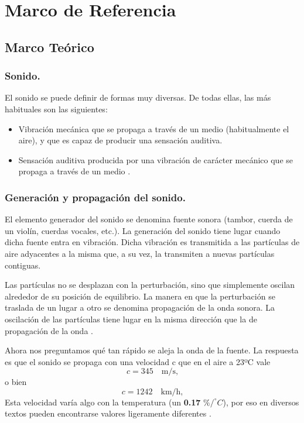 \section{Marco de Referencia}
\subsection{Marco Teórico}

\subsubsection{Sonido.} El sonido se puede definir de formas muy diversas. De todas ellas, las más habituales 
son las siguientes:

\begin{itemize}
    \item 
    Vibración mecánica que se propaga a través de un medio (habitualmente el aire), y que es 
    capaz de producir una sensación auditiva. 
    \item
    Sensación auditiva producida por una vibración de carácter mecánico que se propaga a través de un medio \cite{Isbert1998}.   
\end{itemize}

\subsubsection{Generación y propagación del sonido.} El elemento generador del sonido se denomina 
fuente sonora (tambor, cuerda de un violín, cuerdas vocales, etc.). La generación del sonido 
tiene lugar cuando dicha fuente entra en vibración. Dicha vibración es transmitida a las 
partículas de aire adyacentes a la misma que, a su vez, la transmiten a nuevas partículas 
contiguas.

Las partículas no se desplazan con la perturbación, sino que simplemente oscilan alrededor 
de su posición de equilibrio. La manera en que la perturbación se traslada de un lugar a otro 
se denomina propagación de la onda sonora. La oscilación de las partículas tiene lugar en la 
misma dirección que la de propagación de la onda \cite{Isbert1998}.

Ahora nos preguntamos qué tan rápido se aleja la onda de la fuente. La respuesta es que el 
sonido se propaga con una velocidad c que en el aire a 23ºC vale
\begin{equation}
c = 345 \quad\text{m/s,}
\end{equation}
o bien 
\begin{equation}
c = 1242 \quad\text{km/h,}
\end{equation}
Esta velocidad varía algo con la temperatura (un \textbf{0.17} $\% / ^{\circ} C$),  por eso en diversos textos pueden encontrarse valores ligeramente diferentes \cite{Miyara2004}. 

